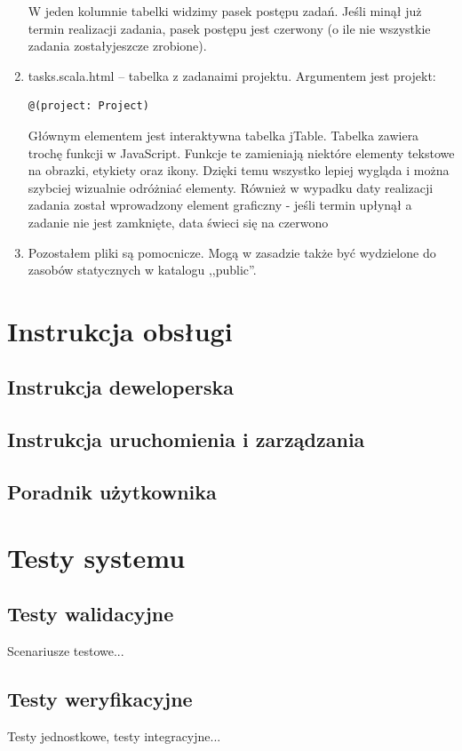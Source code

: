 \documentclass[a4paper,12pt,notitlepage]{mwrep}
\begin{document}
\begin{enumerate}
		W jeden kolumnie tabelki widzimy pasek postępu zadań. Jeśli minął już termin realizacji zadania, pasek postępu jest czerwony (o ile 
		nie wszystkie zadania zostałyjeszcze zrobione).
	\item	tasks.scala.html -- tabelka z zadanaimi projektu. Argumentem jest projekt:
		\begin{verbatim}@(project: Project)\end{verbatim}
		Głównym elementem jest interaktywna tabelka jTable. Tabelka zawiera trochę funkcji w JavaScript. Funkcje te zamieniają niektóre elementy 
		tekstowe na obrazki, etykiety oraz ikony. Dzięki temu wszystko lepiej wygląda i można szybciej wizualnie odróżniać elementy. Również 
		w wypadku daty realizacji zadania został wprowadzony element graficzny - jeśli termin upłynął a zadanie nie jest zamknięte, data świeci 
		się na czerwono
	\item	Pozostałem pliki są pomocnicze. Mogą w zasadzie także być wydzielone do zasobów statycznych w katalogu ,,public''.
	
\end{enumerate}

\chapter{Instrukcja obsługi}

\section{Instrukcja deweloperska}

\section{Instrukcja uruchomienia i zarządzania}

\section{Poradnik użytkownika}

\chapter{Testy systemu}

\section{Testy walidacyjne}
Scenariusze testowe...

\section{Testy weryfikacyjne}
Testy jednostkowe, testy integracyjne...
\end{document}
